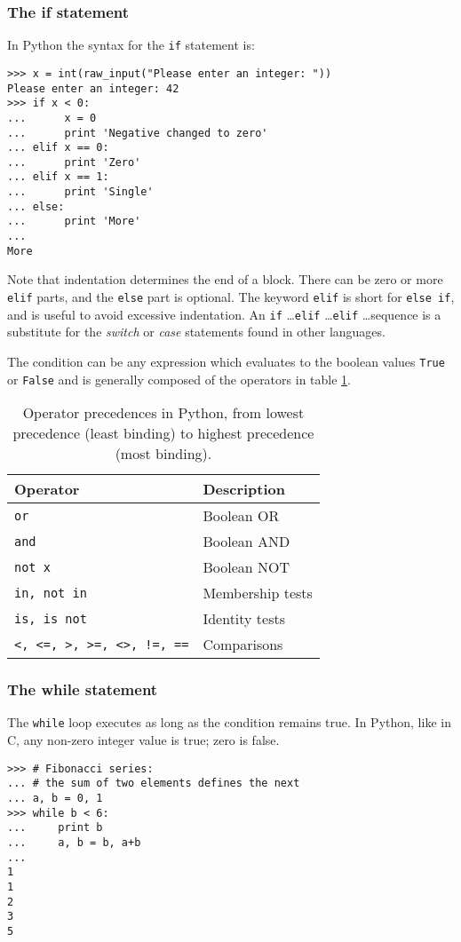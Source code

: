 \documentclass[10pt,a4paper]{article}
\begin{document}
\subsubsection{The if statement}
In Python the syntax for the \verb|if| statement is:
\begin{lstlisting}
>>> x = int(raw_input("Please enter an integer: "))
Please enter an integer: 42
>>> if x < 0:
...      x = 0
...      print 'Negative changed to zero'
... elif x == 0:
...      print 'Zero'
... elif x == 1:
...      print 'Single'
... else:
...      print 'More'
...
More
\end{lstlisting}
Note that indentation determines the end of a block.
There can be zero or more \verb|elif| parts, and the \verb|else| part is optional. The keyword \verb|elif| is short for \verb|else if|, and is useful to avoid excessive indentation. An \verb|if| \ldots \verb|elif| \ldots \verb|elif| \ldots sequence is a substitute for the \emph{switch} or \emph{case} statements found in other languages.

The condition can be any expression which evaluates to the boolean values \verb|True| or \verb|False| and is generally composed of the operators in table \ref{tb:operators}.
\begin{table}
\begin{center}
\caption{Operator precedences in Python, from lowest precedence (least binding) to highest precedence (most binding).}
\label{tb:operators}
\begin{tabular}{ll}
Operator & Description\\
\hline
\verb|or| & Boolean OR\\
\verb|and| & Boolean AND\\
\verb|not x|	& Boolean NOT\\
\verb|in, not in| & Membership tests\\
\verb|is, is not| & Identity tests\\
\verb|<, <=, >, >=, <>, !=, ==| & Comparisons
\end{tabular}
\end{center}
\end{table}
\subsubsection{The while statement}
The \verb|while| loop executes as long as the condition remains true. In Python, like in C, any non-zero integer value is true; zero is false.
\begin{lstlisting}
>>> # Fibonacci series:
... # the sum of two elements defines the next
... a, b = 0, 1
>>> while b < 6:
...     print b
...     a, b = b, a+b
...
1
1
2
3
5
\end{lstlisting}
\end{document}
